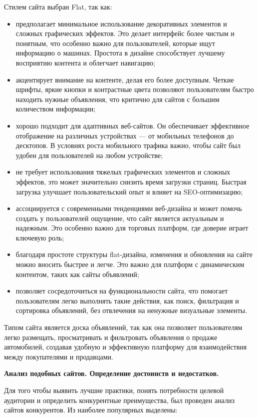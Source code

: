 Стилем сайта выбран \guillemotleft Flat\guillemotright , так как:
\begin{itemize}
    \item предполагает минимальное использование декоративных элементов и сложных графических эффектов. Это делает интерфейс более чистым и понятным, что особенно важно для пользователей, которые ищут информацию о машинах. Простота в дизайне способствует лучшему восприятию контента и облегчает навигацию;
    \item акцентирует внимание на контенте, делая его более доступным. Четкие шрифты, яркие кнопки и контрастные цвета позволяют пользователям быстро находить нужные объявления, что критично для сайтов с большим количеством информации;
    \item хорошо подходит для адаптивных веб-сайтов. Он обеспечивает эффективное отображение на различных устройствах — от мобильных телефонов до десктопов. В условиях роста мобильного трафика важно, чтобы сайт был удобен для пользователей на любом устройстве;
    \item не требует использования тяжелых графических элементов и сложных эффектов, это может значительно снизить время загрузки страниц. Быстрая загрузка улучшает пользовательский опыт и влияет на SEO-оптимизацию;
    \item ассоциируется с современными тенденциями веб-дизайна и может помочь создать у пользователей ощущение, что сайт является актуальным и надежным. Это особенно важно для торговых платформ, где доверие играет ключевую роль;
    \item благодаря простоте структуры flat-дизайна, изменения и обновления на сайте можно вносить быстрее и легче. Это важно для платформ с динамическим контентом, таких как сайты объявлений;
    \item позволяет сосредоточиться на функциональности сайта, что помогает пользователям легко выполнять такие действия, как поиск, фильтрация и сортировка объявлений, без отвлечения на ненужные визуальные элементы.
\end{itemize}

Типом сайта является доска объявлений, так как она позволяет пользователям легко размещать, просматривать и фильтровать объявления о продаже автомобилей, создавая удобную и эффективную платформу для взаимодействия между покупателями и продавцами.
\bigskip

\textbf{Анализ подобных сайтов. Определение достоинств и недостатков.}

Для того чтобы выявить лучшие практики, понять потребности целевой аудитории и определить конкурентные преимущества, был проведен анализ сайтов конкурентов. Из наиболее популярных выделены:

